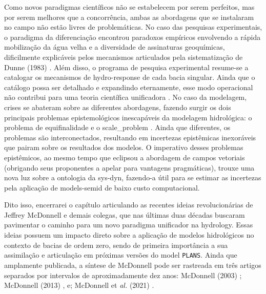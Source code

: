 \documentclass[./main.tex]{subfiles}
\begin{document}
\par Como novos paradigmas científicos não se estabelecem por serem perfeitos, mas por serem melhores que a concorrência, ambas as abordagens que se instalaram no campo não estão livres de problemáticas. No caso das pesquisas experimentais, o \gls{paradigma} da diferenciação encontrou paradoxos empíricos envolvendo a rápida mobilização da água velha e a diversidade de assinaturas geoquímicas, dificilmente explicáveis pelos mecanismos articulados pela sistematização de Dunne (1983) \cite{Dunne1983}. Além disso, o programa de pesquisa experimental resume-se a catalogar os mecanismos de \gls{hydro-response} de cada bacia singular. Ainda que o catálogo possa ser detalhado e expandindo eternamente, esse modo operacional não contribui para uma \gls{teoria} científica unificadora \cite{Mcdonnell2003a}. No caso da modelagem, crises se abateram sobre as diferentes abordagens, fazendo surgir os dois principais problemas epistemológicos inescapáveis da modelagem hidrológica: o problema de equifinalidade e o \gls{scale_problem} \cite{Beven1996a}. Ainda que diferentes, os problemas são interconectados, resultando em incertezas epistêmicas inexoráveis que pairam sobre os resultados dos modelos. O imperativo desses problemas epistêmicos, ao mesmo tempo que eclipsou a abordagem de campos vetoriais (obrigando seus proponentes a apelar para vantagens pragmáticas), trouxe uma nova luz sobre a ontologia da \gls{sys-dyn}, fazendo-a útil para se estimar as incertezas pela aplicação de \gls{models-semid} de baixo custo computacional.

\par Dito isso, encerrarei o capítulo articulando as recentes ideias revolucionárias de Jeffrey McDonnell e demais colegas, que nas últimas duas décadas buscaram pavimentar o caminho para um novo \gls{paradigma} unificador na \gls{hydrology}. Essas ideias possuem um impacto direto sobre a aplicação de modelos hidrológicos no contexto de bacias de ordem zero, sendo de primeira importância a sua assimilação e articulação em próximas versões do \gls{model} \texttt{PLANS}. Ainda que amplamente publicada, a síntese de McDonnell pode ser rastreada em três artigos separados por intervalos de aproximadamente dez anos: McDonnell (2003) \cite{Mcdonnell2003a}; McDonnell (2013) \cite{Mcdonnell2013}, e; McDonnell et \textit{al.} (2021) \cite{mcdonnell2021}.
\end{document}
